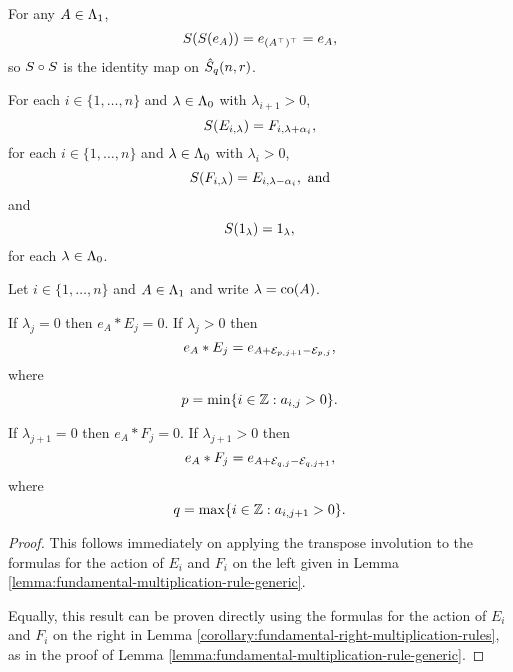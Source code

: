 \documentclass[a4paper, 11pt]{report}
\begin{document}
For any $A\in\Lambda_1{}$,
\begin{equation*}
S{(S{(e_A)})} = e_{(A^\top)^\top} = e_A,
\end{equation*}
so $S{}\circ S{}$ is the identity map on $\hat{S}_q(n,r)$.

For each $i\in\{1,\ldots,n\}$ and $\lambda\in\Lambda_0{}$ with $\lambda_{i+1}>0$,
\begin{equation*}
S{(E_{i,\lambda})} = F_{i,\lambda+\alpha_i},
\end{equation*}
for each $i\in\{1,\ldots,n\}$ and $\lambda\in\Lambda_0{}$ with $\lambda_i>0$,
\begin{equation*}
S{(F_{i,\lambda})} = E_{i,\lambda - \alpha_i}, \text{ and}
\end{equation*}
and
\begin{equation*}
S{(1_\lambda)} = 1_\lambda,
\end{equation*}
for each $\lambda\in\Lambda_0{}$.

\begin{lemma}\label{lemma:fundamental-multiplication-rule-generic-R}
Let $i\in\{1,\ldots,n\}$ and $A\in\Lambda_1{}$ and write $\lambda=\operatorname{co}(A)$.

If $\lambda_j=0$ then $e_A\ast E_j=0$. If $\lambda_j>0$ then
\begin{equation*}
e_A\ast E_j =e_{A+\mathcal{E}_{p,j+1}-\mathcal{E}_{p,j}},
\end{equation*}
where
\begin{equation*}
p=\min\{i\in\mathbb{Z}:a_{i,j}>0\}.
\end{equation*}

If $\lambda_{j+1}=0$ then $e_A\ast F_j=0$. If $\lambda_{j+1}>0$ then
\begin{equation*}
e_A\ast F_j = e_{A+\mathcal{E}_{q,j}-\mathcal{E}_{q,j+1}},
\end{equation*}
where
\begin{equation*}
q=\max\{i\in\mathbb{Z}:a_{i,j+1}>0\}.
\end{equation*}
\end{lemma}

\begin{proof}
This follows immediately on applying the transpose involution to the formulas for the action of $E_i$ and $F_i$ on the left given in Lemma \ref{lemma:fundamental-multiplication-rule-generic}.

Equally, this result can be proven directly using the formulas for the action of $E_i$ and $F_i$ on the right in Lemma \ref{corollary:fundamental-right-multiplication-rules}, as in the proof of Lemma \ref{lemma:fundamental-multiplication-rule-generic}.
\end{proof}
\end{document}

